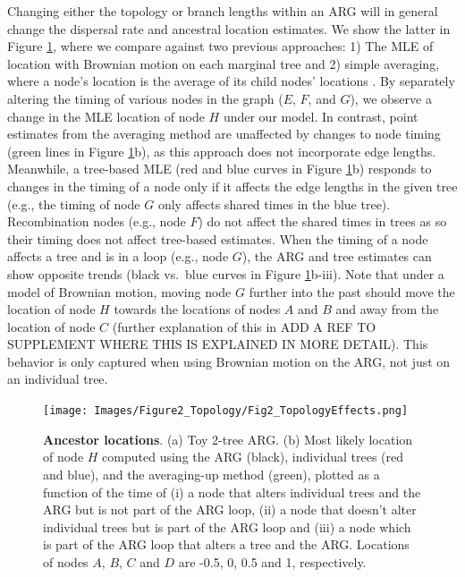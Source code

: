 Changing either the topology or branch lengths within an ARG will in general change the dispersal rate and ancestral location estimates. We show the latter in Figure \ref{fig:3samARG}, where we compare against two previous approaches: 1) The MLE of location with Brownian motion on each marginal tree \citep[as a heuristic for the likelihood method used in][]{osmond2024estimating} and 2) simple averaging, where a node's location is the average of its child nodes' locations \citep[as a heuristic for the method used in][]{Wohns2022}. By separately altering the timing of various nodes in the graph ($E$, $F$, and $G$), we observe a change in the MLE location of node $H$ under our model. In contrast, point estimates from the averaging method are unaffected by changes to node timing (green lines in Figure \ref{fig:3samARG}b), as this approach does not incorporate edge lengths. Meanwhile, a tree-based MLE (red and blue curves in Figure \ref{fig:3samARG}b) responds to changes in the timing of a node only if it affects the edge lengths in the given tree (e.g., the timing of node $G$ only affects shared times in the blue tree). Recombination nodes (e.g., node $F$) do not affect the shared times in trees as so their timing does not affect tree-based estimates. When the timing of a node affects a tree and is in a loop (e.g., node $G$), the ARG and tree estimates can show opposite trends (black vs.\ blue curves in Figure \ref{fig:3samARG}b-iii). Note that under a model of Brownian motion, moving node $G$ further into the past should move the location of node $H$ towards the locations of nodes $A$ and $B$ and away from the location of node $C$ (further explanation of this in ADD A REF TO SUPPLEMENT WHERE THIS IS EXPLAINED IN MORE DETAIL). This behavior is only captured when using Brownian motion on the ARG, not just on an individual tree.

\begin{figure}[ht]
    \centering
    \texttt{[image: Images/Figure2\_Topology/Fig2\_TopologyEffects.png]}
    \caption{\textbf{Ancestor locations}. (a) Toy 2-tree ARG. (b) Most likely location of node $H$ computed using the ARG (black), individual trees (red and blue), and the averaging-up method (green), plotted as a function of the time of (i) a node that alters individual trees and the ARG but is not part of the ARG loop, (ii) a node that doesn't alter individual trees but is part of the ARG loop and (iii) a node which is part of the ARG loop that alters a tree and the ARG. Locations of nodes $A$, $B$, $C$ and $D$ are -0.5, 0, 0.5 and 1, respectively.}
    \label{fig:3samARG}
\end{figure}

